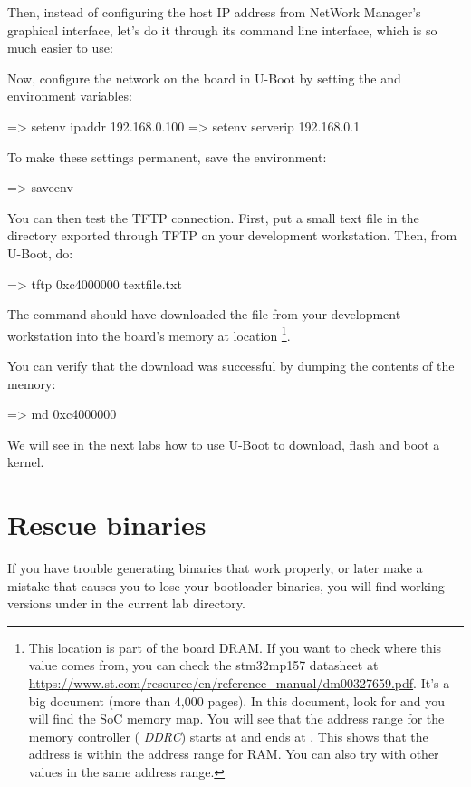 Then, instead of configuring the host IP address from NetWork Manager’s graphical interface,
let’s do it through its command line interface, which is so much easier to use:


Now, configure the network on the board in U-Boot by setting the 
and  environment variables:

\begin{ubootinput}
=> setenv ipaddr 192.168.0.100
=> setenv serverip 192.168.0.1
\end{ubootinput}

To make these settings permanent, save the environment:

\begin{ubootinput}
=> saveenv
\end{ubootinput}

You can then test the TFTP connection. First, put a small text file in
the directory exported through TFTP on your development
workstation. Then, from U-Boot, do:

\begin{ubootinput}
=> tftp 0xc4000000 textfile.txt
\end{ubootinput}

The  command should have downloaded the
 file from your development workstation into
the board's memory at location \footnote{
This location is part of the board DRAM. If you want
to check where this value comes from, you can check the stm32mp157
datasheet at
\url{https://www.st.com/resource/en/reference_manual/dm00327659.pdf}.
It's a big document (more than 4,000 pages). In this document, look
for  and you will find the SoC memory map.
You will see that the address range for the memory controller ({\em
DDRC}) starts at  and ends at . This
shows that the  address is within the address range
for RAM. You can also try with other values in the same address range.}.

You can verify that the download was successful by dumping the
contents of the memory:

\begin{ubootinput}
=> md 0xc4000000
\end{ubootinput}

We will see in the next labs how to use U-Boot to download, flash and
boot a kernel.



\section{Rescue binaries}

If you have trouble generating binaries that work properly, or later
make a mistake that causes you to lose your bootloader binaries, you
will find working versions under  in the current lab
directory.
